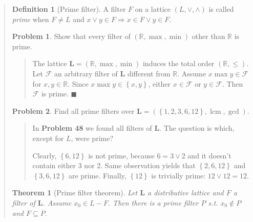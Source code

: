 \documentclass[a4paper, 12pt]{article}
\newtheorem{theorem}{Theorem}
\theoremstyle{definition}
\newtheorem{problem}{Problem}
\theoremstyle{definition}
\theoremstyle{definition}
\newtheorem{definition}{Definition}
\DeclareMathOperator{\lcm}{lcm}
\begin{document}
\begin{quote}
\begin{definition}[Prime filter]
    A filter $F$ on a lattice $(L, \lor, \land)$ is called \textit{prime} when
    $F \neq L$ and $x \lor  y \in F \Rightarrow x \in F \lor  y \in F$.
\end{definition}

\begin{problem}
    Show that every filter of $(\mathbb{R}, \max, \min)$ other than $\mathbb{R}$
    is prime.
\end{problem}


\small
\begin{quote}

    The lattice $\textbf{L} = (\mathbb{R}, \max, \min)$ induces the total order
    $(\mathbb{R}, \leq)$. Let $\mathcal{F}$ an arbitrary filter of \textbf{L}
    different from $\mathbb{R}$. Assume $x \max y \in \mathcal{F}$ for $x, y
    \in \mathbb{R}$. Since $x \max y \in \left\{ x, y \right\} $, either $x \in
    \mathcal{F}$ or $y \in \mathcal{F}$. Then $\mathcal{F}$ is prime.
    $\blacksquare$

\end{quote}
\normalsize

\begin{problem}
    Find all prime filters over $\textbf{L} = \left( \left\{ 1, 2, 3, 6, 12 \right\}, \lcm, \gcd  \right) $.
\end{problem}


\small
\begin{quote}

    In \textbf{Problem 48} we found all filters of \textbf{L}. The question is
    which, except for $L$, were prime? 

    Clearly, $\left\{ 6, 12 \right\} $ is not prime, because $6 = 3 \lor 2$ and
    it doesn't contain either $3$ nor $2$. Same observation 
    yields that $\left\{ 2, 6, 12 \right\} $ and $\left\{ 3, 6, 12
    \right\} $ are prime. Finally, $\left\{ 12 \right\} $ is trivially prime:
    $12 \lor  12 = 12$.


\end{quote}
\normalsize

\begin{theorem}[Prime filter theorem]
    Let $\textbf{L}$ a distributive lattice and $F$ a filter of $\textbf{L}$.
    Assume $x_0 \in L - F$. Then there is a prime filter $P$ s.t. 
    $x_0 \not\in P$ and $F \subseteq P$.
\end{theorem}


\small
\begin{quote}


\end{quote}
\end{quote}
\end{document}
